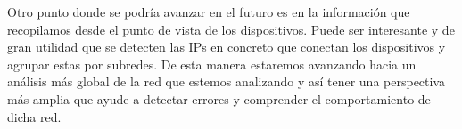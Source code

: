 \documentclass[tfg,epsbased,lof,lot,loa,final,nocopyright,overleaf]{tfgtfmthesisuam}
\begin{document}
Otro punto donde se podría avanzar en el futuro es en la información que recopilamos desde el punto de vista de los dispositivos. Puede ser interesante y de gran utilidad que se detecten las IPs en concreto que conectan los dispositivos y agrupar estas por subredes. De esta manera estaremos avanzando hacia un análisis más global de la red que estemos analizando y así tener una perspectiva más amplia que ayude a detectar errores y comprender el comportamiento de dicha red.

\end{document}
